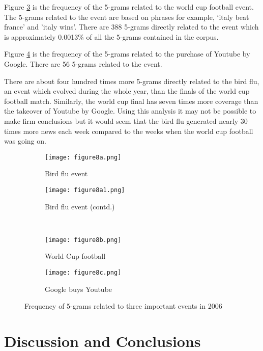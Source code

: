 \documentclass[10pt, conference, compsocconf]{IEEEtran}
\begin{document}
Figure \ref{figure8b} is the frequency of the 5-grams related to the world cup football event. The 5-grams related to the event are based on phrases for example, `italy beat france' and 'italy wins'. There are 388 5-grams directly related to the event which is approximately 0.0013\% of all the 5-grams contained in the corpus. 

Figure \ref{figure8c} is the frequency of the 5-grams related to the purchase of Youtube by Google. There are 56 5-grams related to the event.  
 
There are about four hundred times more 5-grams directly related to the bird flu, an event which evolved during the whole year, than the finals of the world cup football match. Similarly, the world cup final has seven times more coverage than the takeover of Youtube by Google. Using this analysis it may not be possible to make firm conclusions but it would seem that the bird flu generated nearly 30 times more news each week compared to the weeks when the world cup football was going on. 

\begin{figure*}
	\centering
	\begin{subfigure} {0.48\textwidth}
		\centering
  		\texttt{[image: figure8a.png]}
  		\caption{Bird flu event}
  		\label{figure8a}
	\end{subfigure} \hfill
	\begin{subfigure} {0.48\textwidth}
		\centering
		\texttt{[image: figure8a1.png]}
		\caption{Bird flu event (contd.)}
		\label{figure8a1}
	\end{subfigure} \\
	\begin{subfigure} {0.48\textwidth}
		\centering
  		\texttt{[image: figure8b.png]}
  		\caption{World Cup football}
  		\label{figure8b}
	\end{subfigure} \hfill
	\begin{subfigure} {0.48\textwidth}
		\centering
		\texttt{[image: figure8c.png]}
		\caption{Google buys Youtube}
		\label{figure8c}
	\end{subfigure} 
	\caption{Frequency of 5-grams related to three important events in 2006}
	\label{figure8}
\end{figure*} 


\section{Discussion and Conclusions}
\label{conclusions}
\end{document}
